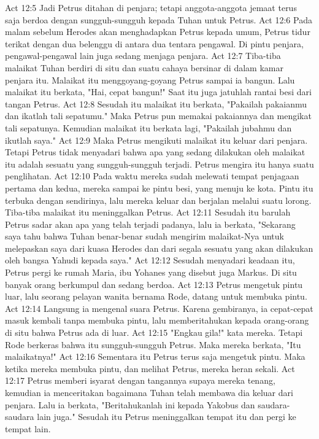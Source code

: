 Act 12:5  Jadi Petrus ditahan di penjara; tetapi anggota-anggota jemaat terus saja berdoa dengan sungguh-sungguh kepada Tuhan untuk Petrus.
Act 12:6  Pada malam sebelum Herodes akan menghadapkan Petrus kepada umum, Petrus tidur terikat dengan dua belenggu di antara dua tentara pengawal. Di pintu penjara, pengawal-pengawal lain juga sedang menjaga penjara.
Act 12:7  Tiba-tiba malaikat Tuhan berdiri di situ dan suatu cahaya bersinar di dalam kamar penjara itu. Malaikat itu menggoyang-goyang Petrus sampai ia bangun. Lalu malaikat itu berkata, "Hai, cepat bangun!" Saat itu juga jatuhlah rantai besi dari tangan Petrus.
Act 12:8  Sesudah itu malaikat itu berkata, "Pakailah pakaianmu dan ikatlah tali sepatumu." Maka Petrus pun memakai pakaiannya dan mengikat tali sepatunya. Kemudian malaikat itu berkata lagi, "Pakailah jubahmu dan ikutlah saya."
Act 12:9  Maka Petrus mengikuti malaikat itu keluar dari penjara. Tetapi Petrus tidak menyadari bahwa apa yang sedang dilakukan oleh malaikat itu adalah sesuatu yang sungguh-sungguh terjadi. Petrus mengira itu hanya suatu penglihatan.
Act 12:10  Pada waktu mereka sudah melewati tempat penjagaan pertama dan kedua, mereka sampai ke pintu besi, yang menuju ke kota. Pintu itu terbuka dengan sendirinya, lalu mereka keluar dan berjalan melalui suatu lorong. Tiba-tiba malaikat itu meninggalkan Petrus.
Act 12:11  Sesudah itu barulah Petrus sadar akan apa yang telah terjadi padanya, lalu ia berkata, "Sekarang saya tahu bahwa Tuhan benar-benar sudah mengirim malaikat-Nya untuk melepaskan saya dari kuasa Herodes dan dari segala sesuatu yang akan dilakukan oleh bangsa Yahudi kepada saya."
Act 12:12  Sesudah menyadari keadaan itu, Petrus pergi ke rumah Maria, ibu Yohanes yang disebut juga Markus. Di situ banyak orang berkumpul dan sedang berdoa.
Act 12:13  Petrus mengetuk pintu luar, lalu seorang pelayan wanita bernama Rode, datang untuk membuka pintu.
Act 12:14  Langsung ia mengenal suara Petrus. Karena gembiranya, ia cepat-cepat masuk kembali tanpa membuka pintu, lalu memberitahukan kepada orang-orang di situ bahwa Petrus ada di luar.
Act 12:15  "Engkau gila!" kata mereka. Tetapi Rode berkeras bahwa itu sungguh-sungguh Petrus. Maka mereka berkata, "Itu malaikatnya!"
Act 12:16  Sementara itu Petrus terus saja mengetuk pintu. Maka ketika mereka membuka pintu, dan melihat Petrus, mereka heran sekali.
Act 12:17  Petrus memberi isyarat dengan tangannya supaya mereka tenang, kemudian ia menceritakan bagaimana Tuhan telah membawa dia keluar dari penjara. Lalu ia berkata, "Beritahukanlah ini kepada Yakobus dan saudara-saudara lain juga." Sesudah itu Petrus meninggalkan tempat itu dan pergi ke tempat lain.
